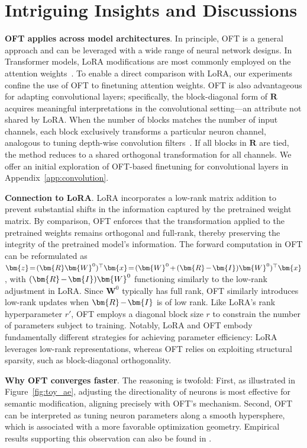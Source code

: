 \section{Intriguing Insights and Discussions}

\textbf{OFT applies across model architectures}. In principle, OFT is a general approach and can be leveraged with a wide range of neural network designs. In Transformer models, LoRA modifications are most commonly employed on the attention weights~\cite{hulora2022}. To enable a direct comparison with LoRA, our experiments confine the use of OFT to finetuning attention weights. OFT is also advantageous for adapting convolutional layers; specifically, the block-diagonal form of $\bm{R}$ acquires meaningful interpretations in the convolutional setting—an attribute not shared by LoRA. When the number of blocks matches the number of input channels, each block exclusively transforms a particular neuron channel, analogous to tuning depth-wise convolution filters~\cite{chollet2017xception}. If all blocks in $\bm{R}$ are tied, the method reduces to a shared orthogonal transformation for all channels. We offer an initial exploration of OFT-based finetuning for convolutional layers in Appendix~\ref{app:convolution}.

\textbf{Connection to LoRA}. LoRA incorporates a low-rank matrix addition to prevent substantial shifts in the information captured by the pretrained weight matrix. By comparison, OFT enforces that the transformation applied to the pretrained weights remains orthogonal and full-rank, thereby preserving the integrity of the pretrained model's information. The forward computation in OFT can be reformulated as $\thickmuskip=2mu \medmuskip=2mu \bm{z}=(\bm{R}\bm{W}^0)^\top\bm{x}=(\bm{W}^0+(\bm{R}-\bm{I})\bm{W}^0)^\top\bm{x}$, with $\thickmuskip=2mu \medmuskip=2mu (\bm{R}-\bm{I})\bm{W}^0$ functioning similarly to the low-rank adjustment in LoRA. Since $\bm{W}^0$ typically has full rank, OFT similarly introduces low-rank updates when $\thickmuskip=2mu \medmuskip=2mu \bm{R}-\bm{I}$ is of low rank. Like LoRA’s rank hyperparameter $r'$, OFT employs a diagonal block size $r$ to constrain the number of parameters subject to training. Notably, LoRA and OFT embody fundamentally different strategies for achieving parameter efficiency: LoRA leverages low-rank representations, whereas OFT relies on exploiting structural sparsity, such as block-diagonal orthogonality.

\textbf{Why OFT converges faster}. The reasoning is twofold: First, as illustrated in Figure~\ref{fig:toy_ae}, adjusting the directionality of neurons is most effective for semantic modification, aligning precisely with OFT’s mechanism. Second, OFT can be interpreted as tuning neuron parameters along a smooth hypersphere, which is associated with a more favorable optimization geometry. Empirical results supporting this observation can also be found in \cite{liu2021orthogonal}.

